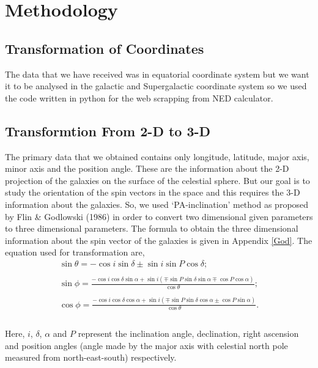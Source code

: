 \section{Methodology}
\subsection{Transformation of Coordinates}
The data that we have received was in equatorial coordinate system but we want it to be analysed in the galactic and Supergalactic coordinate system so we used the code written in python for the web scrapping from NED calculator.
\subsection{Transformtion From 2-D to 3-D}
The primary data that we obtained contains only longitude, latitude, major axis, minor axis and the position angle. These are  the information about the 2-D projection of the galaxies on the surface of the celestial sphere. But our goal is to study the orientation of the spin vectors in the space and this requires the 3-D information about the galaxies. So, we used `PA-inclination' method as proposed by Flin \& Godlowski (1986) in order to convert two dimensional given parameters to three dimensional parameters. The formula to obtain the three dimensional information about the spin vector of the galaxies is given in Appendix \ref{God}. The equation used for transformation are,
\begin{equation}\label{goldwski}
\begin{array}{l}
\sin \theta = -\cos i\sin \delta \pm \sin i\sin P\cos \delta;\\
\\
\sin \phi = \frac{- \cos i\cos \delta\sin \alpha + \sin i(\mp \sin P \sin \delta\sin \alpha \mp \cos P\cos \alpha)}{\cos \theta};\\
\\
\cos \phi = \frac{- \cos i\cos \delta\cos \alpha + \sin i(\mp \sin P \sin \delta\cos \alpha \pm \cos P\sin \alpha)}{\cos \theta}.\\
\end{array}
\end{equation}
\\
Here, $i$, $\delta$, $\alpha$ and $P$ represent the inclination
angle, declination, right ascension and position angles (angle made by the major axis with celestial north pole measured from north-east-south)
respectively.
\\
\\
